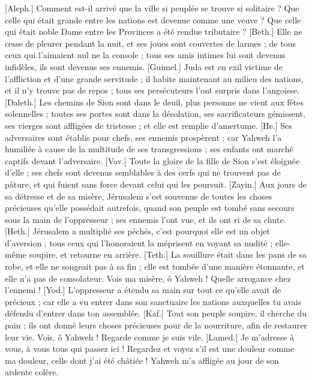 \begin{multicols}{2}
\VerseOne{}[Aleph.] Comment est-il arrivé que la ville si peuplée se trouve si solitaire ? Que celle qui était grande entre les nations est devenue comme une veuve ? Que celle qui était noble Dame entre les Provinces a été rendue tributaire ?
[Beth.] Elle ne cesse de pleurer pendant la nuit, et ses joues sont couvertes de larmes ; de tous ceux qui l'aimaient nul ne la console ; tous ses amis intimes lui sont devenus infidèles, ils sont devenus ses ennemis.
[Guimel.] Juda est en exil victime de l'affliction et d'une grande servitude ; il habite maintenant au milieu des nations, et il n’y trouve pas de repos ; tous ses persécuteurs l'ont surpris dans l'angoisse.
[Daleth.] Les chemins de Sion sont dans le deuil, plus personne ne vient aux fêtes solennelles ; toutes ses portes sont dans la désolation, ses sacrificateurs gémissent, ses vierges sont affligées de tristesse ; et elle est remplie d'amertume.
[He.] Ses adversaires sont établis pour chefs, ses ennemis prospèrent ; car Yahweh l'a humiliée à cause de la multitude de ses transgressions ; ses enfants ont marché captifs devant l'adversaire.
[Vav.] Toute la gloire de la fille de Sion s'est éloignée d'elle ; ses chefs sont devenus semblables à des cerfs qui ne trouvent pas de pâture, et qui fuient sans force devant celui qui les poursuit.
[Zayin.] Aux jours de sa détresse et de sa misère, Jérusalem s’est souvenue de toutes les choses précieuses qu’elle possédait autrefois, quand son peuple est tombé sans secours sous la main de l’oppresseur ; ses ennemis l’ont vue, et ils ont ri de sa chute.
[Heth.] Jérusalem a multiplié ses péchés, c'est pourquoi elle est un objet d'aversion ; tous ceux qui l'honoraient la méprisent en voyant sa nudité ; elle-même soupire, et retourne en arrière.
[Teth.] La souillure était dans les pans de sa robe, et elle ne songeait pas à sa fin ; elle est tombée d'une manière étonnante, et elle n'a pas de consolateur. Vois ma misère, ô Yahweh ! Quelle arrogance chez l'ennemi !
[Yod.] L’oppresseur a étendu sa main sur tout ce qu’elle avait de précieux ; car elle a vu entrer dans son sanctuaire les nations auxquelles tu avais défendu d’entrer dans ton assemblée.
[Kaf.] Tout son peuple soupire, il cherche du pain ; ils ont donné leurs choses précieuses pour de la nourriture, afin de restaurer leur vie. Vois, ô Yahweh ! Regarde comme je suis vile.
[Lamed.] Je m'adresse à vous, à vous tous qui passez ici ! Regardez et voyez s'il est une douleur comme ma douleur, celle dont j'ai été châtiée ! Yahweh m'a affligée au jour de son ardente colère.

\end{multicols}
